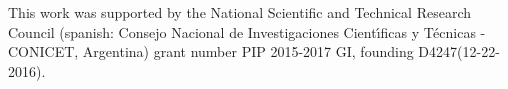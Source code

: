 \begin{acknowledgments}
This work was supported by the National Scientific and Technical 
Research Council (spanish: Consejo Nacional de Investigaciones Cient\'\i ficas 
y T\'ecnicas - CONICET, Argentina) grant number PIP 2015-2017 GI, founding 
D4247(12-22-2016).
\end{acknowledgments}
